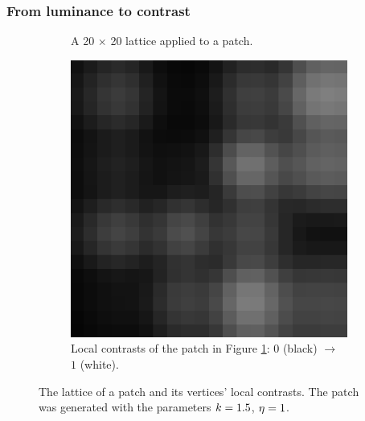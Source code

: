 \subsubsection{From luminance to contrast}

\begin{figure}[t]
    \centering
    \begin{subfigure}[t]{0.4\textwidth}
        \centering
        
        \caption{A 20 $\times$ 20 lattice applied to a patch.}
        \label{fig:llc-lattice-example}
    \end{subfigure}
    \hspace{0.06\textwidth}
    \begin{subfigure}[t]{0.4\textwidth}
        \centering
        \includegraphics[width=\textwidth]{src/assets/images/local-contrast.png}
        \caption{Local contrasts of the patch in Figure \ref{fig:llc-lattice-example}: $0$ (black) $\to$ $1$ (white).}
        \label{fig:llc-local-contrast-example}
    \end{subfigure}
    \caption[Patch lattice and local contrast]{The lattice of a patch and its vertices' local contrasts. 
    The patch was generated with the parameters $k = 1.5$, $\eta = 1$.}
    \label{fig:lattice-local-contrast-example}
\end{figure}

